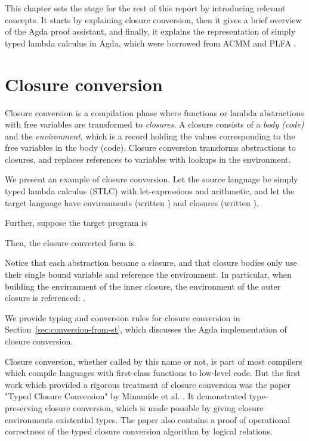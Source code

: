 \documentclass[bsc,frontabs,oneside,singlespacing,parskip,deptreport]{infthesis}
\theoremstyle{definition}
\theoremstyle{lemma}
\begin{document}
This chapter sets the stage for the rest of this report by introducing
relevant concepts. It starts by explaining closure conversion, then it
gives a brief overview of the Agda proof assistant, and finally, it
explains the representation of simply typed lambda calculus in Agda,
which were borrowed from ACMM \cite{DBLP:journals/pacmpl/AllaisA0MM18}
and PLFA \cite{DBLP:conf/sbmf/Wadler18}.

\section{Closure conversion}
\label{sec:closure-conversion}

Closure conversion is a compilation phase where functions or lambda
abstractions with free variables are transformed to
\textit{closures}. A closure consists of a \textit{body (code)} and
the \textit{environment}, which is a record holding the values
corresponding to the free variables in the body (code). Closure
conversion transforms abstractions to closures, and replaces
references to variables with lookups in the environment.

We present an example of closure conversion. Let the source language
be simply typed lambda calculus (STLC) with let-expressions and
arithmetic, and let the target language have environments (written
) and closures (written ).

Further, suppose the target program is


Then, the closure converted form is


Notice that each abstraction became a closure, and that closure bodies
only use their single bound variable and reference the environment. In
particular, when building the environment of the inner closure, the
environment of the outer closure is referenced: .

We provide typing and conversion rules for closure conversion in
Section~\ref{sec:conversion-from-st}, which discusses the Agda
implementation of closure conversion.

Closure conversion, whether called by this name or not, is part of
most compilers which compile languages with first-class functions to
low-level code. But the first work which provided a rigorous treatment
of closure conversion was the paper "Typed Closure Conversion" by
Minamide et al. \cite{DBLP:conf/popl/MinamideMH96}. It demonstrated
type-preserving closure conversion, which is made possible by giving
closure environments existential types. The paper also contains a
proof of operational correctness of the typed closure conversion
algorithm by logical relations.
\end{document}
